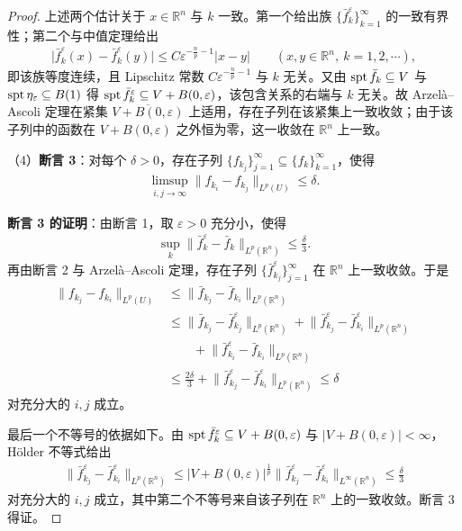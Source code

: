 ﻿\documentclass[../../main.tex]{subfiles}%
\begin{document}
\begin{proof}
上述两个估计关于 $x\in\mathbb{R}^n$ 与 $k$ 一致。第一个给出族 $\{\bar f_k^\varepsilon\}_{k=1}^{\infty}$ 的一致有界性；第二个与中值定理给出
\begin{align*}
\lvert\bar f_k^\varepsilon(x)-\bar f_k^\varepsilon(y)\rvert\leqslant C\varepsilon^{-\frac np-1}\lvert x-y\rvert\qquad(x,y\in\mathbb{R}^n,\ k=1,2,\cdots),
\end{align*}
即该族等度连续，且 Lipschitz 常数 $C\varepsilon^{-\frac np-1}$ 与 $k$ 无关。又由 $\operatorname{spt}\bar f_k\subseteq V$ 与 $\operatorname{spt}\eta_\varepsilon\subseteq B(1)$ 得 $\operatorname{spt}\bar f_k^\varepsilon\subseteq V+B(0,\varepsilon)$，该包含关系的右端与 $k$ 无关。故 Arzelà--Ascoli 定理在紧集 $\overline{V+B(0,\varepsilon)}$ 上适用，存在子列在该紧集上一致收敛；由于该子列中的函数在 $V+B(0,\varepsilon)$ 之外恒为零，这一收敛在 $\mathbb{R}^n$ 上一致。

（4）\textbf{断言 3}：对每个 $\delta>0$，存在子列 $\{f_{k_j}\}_{j=1}^{\infty}\subseteq\{f_k\}_{k=1}^{\infty}$，使得
\begin{align*}
\limsup_{i,j\to\infty}\lVert f_{k_i}-f_{k_j}\rVert_{L^p(U)}\leqslant\delta .
\end{align*}

\textbf{断言 3 的证明}：由断言 1，取 $\varepsilon>0$ 充分小，使得
\begin{align*}
\sup_{k}\lVert\bar f_k^\varepsilon-\bar f_k\rVert_{L^p(\mathbb{R}^n)}\leqslant\frac{\delta}{3}.
\end{align*}
再由断言 2 与 Arzelà--Ascoli 定理，存在子列 $\{\bar f_{k_j}^\varepsilon\}_{j=1}^{\infty}$ 在 $\mathbb{R}^n$ 上一致收敛。于是
\begin{align*}
\lVert f_{k_j}-f_{k_i}\rVert_{L^p(U)}
&\leqslant\lVert\bar f_{k_j}-\bar f_{k_i}\rVert_{L^p(\mathbb{R}^n)}\\
&\leqslant\lVert\bar f_{k_j}-\bar f_{k_j}^\varepsilon\rVert_{L^p(\mathbb{R}^n)}+\lVert\bar f_{k_j}^\varepsilon-\bar f_{k_i}^\varepsilon\rVert_{L^p(\mathbb{R}^n)}\\
&\qquad+\lVert\bar f_{k_i}^\varepsilon-\bar f_{k_i}\rVert_{L^p(\mathbb{R}^n)}\\
&\leqslant\frac{2\delta}{3}+\lVert\bar f_{k_j}^\varepsilon-\bar f_{k_i}^\varepsilon\rVert_{L^p(\mathbb{R}^n)}\leqslant\delta
\end{align*}
对充分大的 $i,j$ 成立。

最后一个不等号的依据如下。由 $\operatorname{spt}\bar f_k^\varepsilon\subseteq V+B(0,\varepsilon)$ 与 $\lvert V+B(0,\varepsilon)\rvert<\infty$，Hölder 不等式给出
\begin{align*}
\lVert\bar f_{k_j}^\varepsilon-\bar f_{k_i}^\varepsilon\rVert_{L^p(\mathbb{R}^n)}\leqslant\lvert V+B(0,\varepsilon)\rvert^{\frac1p}\lVert\bar f_{k_j}^\varepsilon-\bar f_{k_i}^\varepsilon\rVert_{L^\infty(\mathbb{R}^n)}\leqslant\frac{\delta}{3}
\end{align*}
对充分大的 $i,j$ 成立，其中第二个不等号来自该子列在 $\mathbb{R}^n$ 上的一致收敛。断言 3 得证。


\end{proof}
\end{document}
